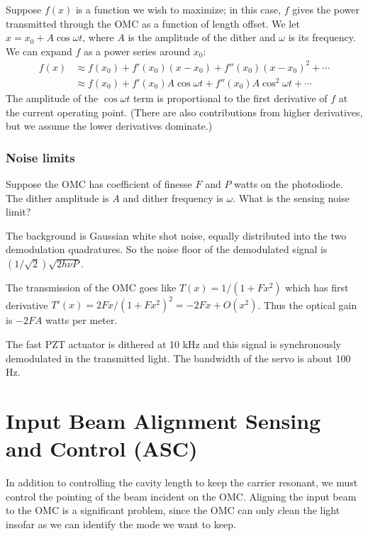 Suppose $f(x)$ is a function we wish to maximize; in this case, $f$
gives the power transmitted through the OMC as a function of length
offset.  We let $x = x_0 + A \cos\omega t$, where $A$ is the amplitude
of the dither and $\omega$ is its frequency.  We can expand $f$ as a
power series around $x_0$: 
\begin{align}
f(x) &\approx f(x_0) + f'(x_0)\left(x - x_0\right) + f''(x_0)\left(x-x_0\right)^2 + \cdots \\
     &\approx f(x_0) + f'(x_0)A\cos\omega t        + f''(x_0)A\cos^2\omega t + \cdots
\end{align}
%
The amplitude of the $\cos\omega t$ term is proportional to the first
derivative of $f$ at the current operating point.  (There are also
contributions from higher derivatives, but we assume the lower
derivatives dominate.)

\subsubsection{Noise limits}

Suppose the OMC has coefficient of finesse $F$ and $P$ watts on the
photodiode.  The dither amplitude is $A$ and dither frequency is
$\omega$.  What is the sensing noise limit?

The background is Gaussian white shot noise, equally distributed into
the two demodulation quadratures.  So the noise floor of the
demodulated signal is $(1/\sqrt{2})\sqrt{2 h \nu P}$.

The transmission of the OMC goes like $T(x) = 1/\left(1 + Fx^2\right)$
which has first derivative $T'(x) = 2 F x / \left(1 + F x^2\right)^2 =
- 2 F x + O(x^2)$.  Thus the optical gain is $-2 F A$ watts per meter.

The fast PZT actuator is dithered at 10 kHz and this signal is
synchronously demodulated in the transmitted light.  The bandwidth of
the servo is about 100 Hz.

\section{Input Beam Alignment Sensing and Control (ASC)}

In addition to controlling the cavity length to keep the carrier
resonant, we must control the pointing of the beam incident on the
OMC.
Aligning the input beam to the OMC is a significant problem, since the OMC
can only clean the light insofar as we can identify the mode we want to
keep.

